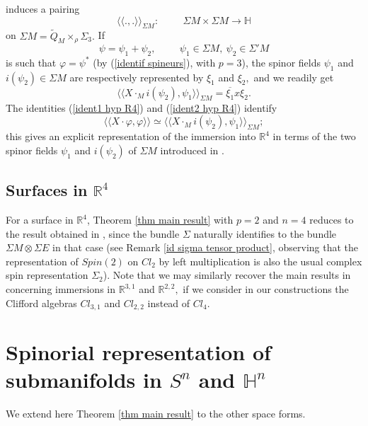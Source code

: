 \documentclass{amsart}
\begin{document}
induces a pairing
$$\langle\langle.,.\rangle\rangle_{\Sigma M}:\hspace{1cm}\Sigma M\times\Sigma M\rightarrow{\mathbb{H}}$$ 
on $\Sigma M=\tilde{Q}_M\times_{\rho}\Sigma_3.$ If
$$\psi=\psi_1+\psi_2,\hspace{1cm} \psi_1\in\Sigma M,\ \psi_2\in \Sigma'M$$
is such that $\varphi=\psi^*$ (by (\ref{identif spineurs}), with $p=3$), the spinor fields $\psi_1$ and $i(\psi_2)\in \Sigma M$ are respectively represented by $\xi_1$ and $\xi_2,$ and we readily get
\begin{equation}\label{ident2 hyp R4}
\langle\langle X\cdot_M i(\psi_2),\psi_1\rangle\rangle_{\Sigma M}=\overline{\xi_1}x\xi_2.
\end{equation}
The identities (\ref{ident1 hyp R4}) and (\ref{ident2 hyp R4}) identify
$$\langle\langle X\cdot\varphi,\varphi\rangle\rangle\simeq \langle\langle X\cdot_M i(\psi_2),\psi_1\rangle\rangle_{\Sigma M};$$
this gives an explicit representation of the immersion into ${\mathbb{R}}^4$ in terms of the two spinor fields $\psi_1$ and $i(\psi_2)$ of $\Sigma M$ introduced in \cite{LR1}.
\subsection{Surfaces in ${\mathbb{R}}^4$}\label{sec surface R4}
For a surface in ${\mathbb{R}}^4$, Theorem \ref{thm main result} with $p=2$ and $n=4$ reduces to the result obtained in \cite{BLR}, since the bundle $\Sigma$ naturally identifies to the bundle $\Sigma M\otimes\Sigma E$ in that case (see Remark \ref{id sigma tensor product}, observing that the representation of $Spin(2)$ on $Cl_2$ by left multiplication is also the usual complex spin representation $\Sigma_2$). Note that we may similarly recover the main results in \cite{Bay,BP} concerning immersions in ${\mathbb{R}}^{3,1}$ and ${\mathbb{R}}^{2,2},$ if we consider in our constructions the Clifford algebras $Cl_{3,1}$ and $Cl_{2,2}$ instead of $Cl_4.$ 
\section{Spinorial representation of submanifolds in $S^n$ and ${\mathbb{H}}^n$}
We extend here Theorem \ref{thm main result} to the other space forms.
\end{document}
